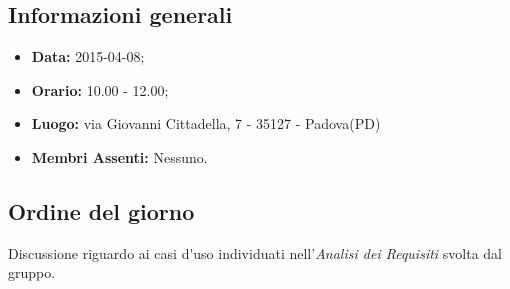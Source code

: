 \subsection{Informazioni generali}
\begin{itemize}
	\item \textbf{Data:} 2015-04-08;
	\item \textbf{Orario:} 10.00 - 12.00;
	\item \textbf{Luogo:} via Giovanni Cittadella, 7 - 35127 - Padova(PD)
	\item \textbf{Membri Assenti:} Nessuno.
\end{itemize}

\subsection{Ordine del giorno}
Discussione riguardo ai \gls{casi d'uso} individuati nell'\textit{Analisi dei Requisiti} svolta dal gruppo.

